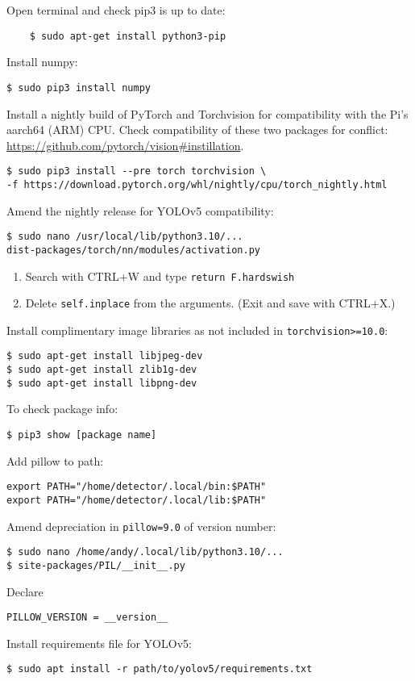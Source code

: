 \documentclass[12pt, a4paper, oneside]{article}
\begin{document}
Open terminal and check pip3 is up to date:
\begin{verbatim}
	$ sudo apt-get install python3-pip 
\end{verbatim}
Install numpy:
\begin{verbatim}
$ sudo pip3 install numpy
\end{verbatim}
Install a nightly build of PyTorch and Torchvision for compatibility with the Pi's aarch64 (ARM) CPU. Check compatibility of these two packages for conflict: \url{https://github.com/pytorch/vision#instillation}.
\begin{verbatim}
$ sudo pip3 install --pre torch torchvision \
-f https://download.pytorch.org/whl/nightly/cpu/torch_nightly.html
\end{verbatim}
Amend the nightly release for YOLOv5 compatibility:
\begin{verbatim}
$ sudo nano /usr/local/lib/python3.10/...
dist-packages/torch/nn/modules/activation.py
\end{verbatim}
\begin{enumerate}
\item
Search with CTRL+W and type \texttt{return F.hardswish}
\item
Delete \texttt{self.inplace} from the arguments. (Exit and save with CTRL+X.)
\end{enumerate}
Install complimentary image libraries as not included in \texttt{torchvision>=10.0}:
\begin{verbatim}
$ sudo apt-get install libjpeg-dev
$ sudo apt-get install zlib1g-dev
$ sudo apt-get install libpng-dev
\end{verbatim}
To check package info:
\begin{verbatim}
$ pip3 show [package name]
\end{verbatim}
Add pillow to path:
\begin{verbatim}
export PATH="/home/detector/.local/bin:$PATH"
export PATH="/home/detector/.local/lib:$PATH"
\end{verbatim}
Amend depreciation in \texttt{pillow=9.0} of version number:
\begin{verbatim}
$ sudo nano /home/andy/.local/lib/python3.10/...
$ site-packages/PIL/__init__.py
\end{verbatim}
Declare
\begin{verbatim}
PILLOW_VERSION = __version__
\end{verbatim}
Install requirements file for YOLOv5:
\begin{verbatim}
$ sudo apt install -r path/to/yolov5/requirements.txt
\end{verbatim}
\end{document}
